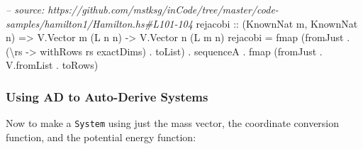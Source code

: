 \documentclass[]{article}
\newenvironment{Shaded}{}{}
\newcommand{\DataTypeTok}[1]{\textcolor[rgb]{0.56,0.13,0.00}{#1}}
\newcommand{\CommentTok}[1]{\textcolor[rgb]{0.38,0.63,0.69}{\textit{#1}}}
\newcommand{\OtherTok}[1]{\textcolor[rgb]{0.00,0.44,0.13}{#1}}
\newcommand{\FunctionTok}[1]{\textcolor[rgb]{0.02,0.16,0.49}{#1}}
\newcommand{\NormalTok}[1]{#1}
\begin{document}
\begin{Shaded}
\begin{Highlighting}[]
\CommentTok{-- source: https://github.com/mstksg/inCode/tree/master/code-samples/hamilton1/Hamilton.hs#L101-104}
\OtherTok{rejacobi ::}\NormalTok{ (}\DataTypeTok{KnownNat}\NormalTok{ m, }\DataTypeTok{KnownNat}\NormalTok{ n) }\OtherTok{=>} \DataTypeTok{V.Vector}\NormalTok{ m (}\DataTypeTok{L}\NormalTok{ n n) }\OtherTok{->} \DataTypeTok{V.Vector}\NormalTok{ n (}\DataTypeTok{L}\NormalTok{ m n)}
\NormalTok{rejacobi }\FunctionTok{=}\NormalTok{ fmap (fromJust }\FunctionTok{.}\NormalTok{ (\textbackslash{}rs }\OtherTok{->}\NormalTok{ withRows rs exactDims) }\FunctionTok{.}\NormalTok{ toList)}
         \FunctionTok{.}\NormalTok{ sequenceA}
         \FunctionTok{.}\NormalTok{ fmap (fromJust }\FunctionTok{.}\NormalTok{ V.fromList }\FunctionTok{.}\NormalTok{ toRows)}
\end{Highlighting}
\end{Shaded}

\subsubsection{Using AD to Auto-Derive
Systems}\label{using-ad-to-auto-derive-systems}

Now to make a \texttt{System} using just the mass vector, the coordinate
conversion function, and the potential energy function:
\end{document}
